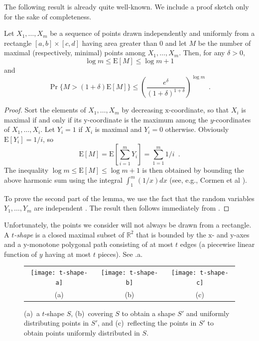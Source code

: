 \documentclass[lotsofwhite,charterfonts]{patmorin}
\newcommand{\RR}{\mathbb{R}}
\newcommand{\PROB}{\Pr}
\newcommand{\EXP}{\mathrm{E}}
\begin{document}
The following result is already quite well-known.  We include a
proof sketch only for the sake of completeness.

\begin{lem}
  Let $X_1,\ldots,X_m$ be a sequence of points drawn independently and
  uniformly from a rectangle $[a,b]\times[c,d]$ having area greater than
  0 and let $M$ be the number of maximal (respectively, minimal) points
  among $X_1,\ldots,X_m$.  Then, for any $\delta >0$,
  \begin{equation}
    \log m \le \EXP[M] \le \log m + 1
  \end{equation}
  and 
  \begin{equation}
    \PROB\{M>(1+\delta)\EXP[M]\} 
        \le \left(\frac{e^\delta}{(1+\delta)^{1+\delta}}\right)^{\log m}
		 \enspace .
  \end{equation}
\end{lem}

\begin{proof}
Sort the elements of $X_1,\ldots,X_m$ by decreasing
$\mathrm{x}$-coordinate, so that $X_i$ is maximal if and only if its
$\mathrm{y}$-coordinate is the maximum among the $y$-coordinates of
$X_1,\ldots,X_i$.  Let $Y_i=1$ if $X_i$ is maximal and $Y_i=0$ otherwise.
Obviously $\EXP[Y_i]=1/i$, so
\[
   \EXP[M] = \EXP\left[\sum_{i=1}^m Y_i\right] = \sum_{1=1}^m 1/i \enspace .
\]
The inequality $\log m \le \EXP[M]\le \log m + 1$ is then obtained by
bounding the above harmonic sum using the integral $\int_{1}^{m}(1/x)dx$
(see, e.g., Cormen et al \cite[Appendix A.2]{clrs06}).

To prove the second part of the lemma, we use the fact that the random
variables $Y_1,\ldots,Y_m$ are independent \cite{d88,g78}.  The result
then follows immediately from .
\end{proof}

Unfortunately, the points we consider will not always be drawn
from a rectangle.  A \emph{$t$-shape} is a closed maximal subset
of $\RR^2$ that is bounded by the $\mathrm x$- and $\mathrm y$-axes
and a $\mathrm y$-monotone polygonal path consisting of at most $t$
edges (a piecewise linear function of $y$ having at most $t$ pieces).
See .a.

\begin{figure}
  \begin{center}
    \begin{tabular}{ccc}
      \texttt{[image: t-shape-a]} & 
      \texttt{[image: t-shape-b]} & 
      \texttt{[image: t-shape-c]} \\
      (a) & (b) & (c)
    \end{tabular}
  \end{center}
  \caption{(a)~a $t$-shape $S$, (b)~covering $S$ to obtain a shape $S'$ and
uniformly distributing points in $S'$, and (c)~reflecting the points in
$S'$ to obtain points uniformly distributed in $S$.}
\end{figure}
\end{document}
